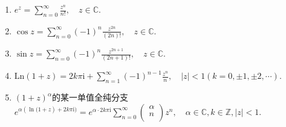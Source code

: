 \documentclass[../../main.tex]{subfiles}%
\begin{document}
\begin{proposition}[常用的初等函数的Taylor展开式]\label{proposition:常用的初等函数的Taylor展开式}
\begin{enumerate}[(1)]
\item $e^z = \sum_{n=0}^{\infty} \frac{z^n}{n!}, \quad z \in \mathbb{C}.$

\item $\cos z = \sum_{n=0}^{\infty} (-1)^n \frac{z^{2n}}{(2n)!},\quad z \in \mathbb{C}.$

\item $\sin z = \sum_{n=0}^{\infty} (-1)^n \frac{z^{2n + 1}}{(2n + 1)!},\quad z \in \mathbb{C}.$

\item $\mathrm{Ln}(1 + z) = 2k\pi \mathrm{i}+\sum_{n=1}^{\infty} (-1)^{n - 1} \frac{z^n}{n}, \quad |z| < 1(k=0,\pm 1,\pm 2,\cdots).$

\item $(1+z)^\alpha$的某一单值全纯分支$e^{\alpha (\ln\mathrm{(}1+z)+2k\pi \mathrm{i)}}=e^{\alpha \cdot 2k\pi \mathrm{i}}\sum_{n=0}^{\infty}{\left( \begin{array}{c}
\alpha\\
n\\
\end{array} \right) z^n,\quad \alpha}\in \mathbb{C} ,k\in \mathbb{Z} ,|z|<1.$
\end{enumerate}
\end{proposition}
\end{document}
